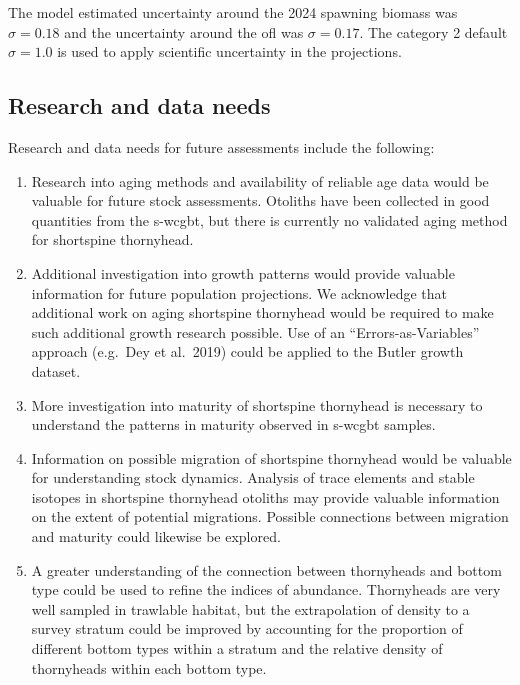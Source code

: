 \documentclass[11pt,
  english,
  letterpaper,
]{article}
\providecommand{\tightlist}{%
  \setlength{\itemsep}{0pt}\setlength{\parskip}{0pt}}
\providecommand{\tightlist}{%
  \setlength{\itemsep}{0pt}\setlength{\parskip}{0pt}}
\begin{document}
The model estimated uncertainty around the 2024 spawning biomass was \(\sigma= 0.18\) and the uncertainty around the \gls{ofl} was \(\sigma = 0.17\). The category 2 default \(\sigma = 1.0\) is used to apply scientific uncertainty in the projections.

\hypertarget{research-and-data-needs}{%
\subsection*{Research and data needs}\label{research-and-data-needs}}

Research and data needs for future assessments include the following:

\begin{enumerate}
\def\labelenumi{\arabic{enumi}.}
\tightlist
\item
  Research into aging methods and availability of reliable age data would be valuable for future stock assessments. Otoliths have been collected in good quantities from the \gls{s-wcgbt}, but there is currently no validated aging method for shortspine thornyhead.
\item
  Additional investigation into growth patterns would provide valuable information for future population projections. We acknowledge that additional work on aging shortspine thornyhead would be required to make such additional growth research possible. Use of an ``Errors-as-Variables'' approach (e.g.~Dey et al.~2019) could be applied to the Butler growth dataset.
\item
  More investigation into maturity of shortspine thornyhead is necessary to understand the patterns in maturity observed in \gls{s-wcgbt} samples.
\item
  Information on possible migration of shortspine thornyhead would be valuable for understanding stock dynamics. Analysis of trace elements and stable isotopes in shortspine thornyhead otoliths may provide valuable information on the extent of potential migrations. Possible connections between migration and maturity could likewise be explored.
\item
  A greater understanding of the connection between thornyheads and bottom type could be used to refine the indices of abundance. Thornyheads are very well sampled in trawlable habitat, but the extrapolation of density to a survey stratum could be improved by accounting for the proportion of different bottom types within a stratum and the relative density of thornyheads within each bottom type.

\end{enumerate}
\end{document}
